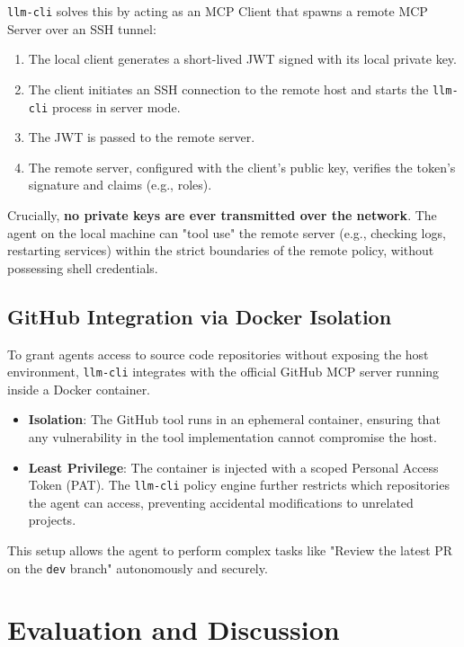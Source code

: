 \documentclass[conference]{IEEEtran}
\begin{document}
\texttt{llm-cli} solves this by acting as an MCP Client that spawns a remote MCP Server over an SSH tunnel:
\begin{enumerate}
    \item The local client generates a short-lived JWT signed with its local private key.
    \item The client initiates an SSH connection to the remote host and starts the \texttt{llm-cli} process in server mode.
    \item The JWT is passed to the remote server.
    \item The remote server, configured with the client's public key, verifies the token's signature and claims (e.g., roles).
\end{enumerate}

Crucially, \textbf{no private keys are ever transmitted over the network}. The agent on the local machine can "tool use" the remote server (e.g., checking logs, restarting services) within the strict boundaries of the remote policy, without possessing shell credentials.

\subsection{GitHub Integration via Docker Isolation}
To grant agents access to source code repositories without exposing the host environment, \texttt{llm-cli} integrates with the official GitHub MCP server running inside a Docker container.

\begin{itemize}
    \item \textbf{Isolation}: The GitHub tool runs in an ephemeral container, ensuring that any vulnerability in the tool implementation cannot compromise the host.
    \item \textbf{Least Privilege}: The container is injected with a scoped Personal Access Token (PAT). The \texttt{llm-cli} policy engine further restricts which repositories the agent can access, preventing accidental modifications to unrelated projects.
\end{itemize}

This setup allows the agent to perform complex tasks like "Review the latest PR on the \texttt{dev} branch" autonomously and securely.

\section{Evaluation and Discussion}
\end{document}
